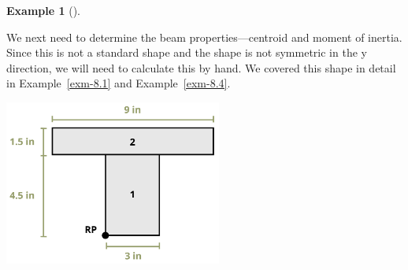 \documentclass[
  letterpaper,
  DIV=11,
  numbers=noendperiod]{scrreprt}
\theoremstyle{definition}
\newtheorem{example}{Example}[chapter]
\theoremstyle{remark}
\begin{document}
\begin{tcolorbox}
\begin{example}[]
\begin{tcolorbox}
We next need to determine the beam properties---centroid and moment of
inertia. Since this is not a standard shape and the shape is not
symmetric in the y direction, we will need to calculate this by hand. We
covered this shape in detail in Example~\ref{exm-8.1} and
Example~\ref{exm-8.4}.

\begin{center}
\includegraphics[width=2.8125in,height=\textheight]{images/CH9 PNGs/Example 9.1 part 3.png}
\end{center}


\end{tcolorbox}
\end{example}
\end{tcolorbox}
\end{document}
